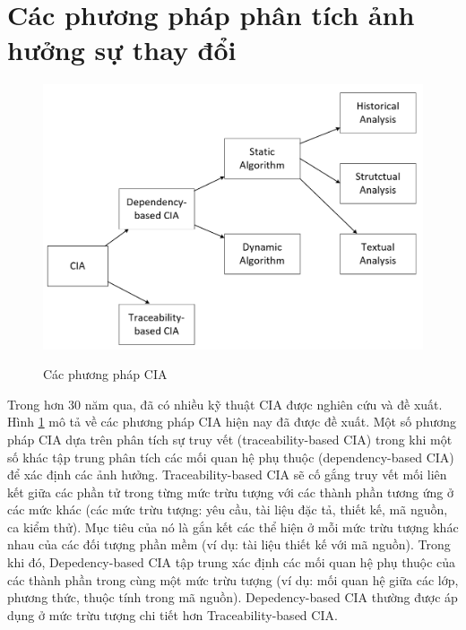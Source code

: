 \documentclass[12pt]{report}
\begin{document}
\section{Các phương pháp phân tích ảnh hưởng sự thay đổi}
\begin{figure}[h]
	\centering
	\includegraphics[scale=0.5]{CIA-hierarchy}
	\label{fig:cia-hierarchy}
	\caption{Các phương pháp CIA}
\end{figure}

Trong hơn 30 năm qua, đã có nhiều kỹ thuật CIA được nghiên cứu và đề xuất. Hình \ref{fig:cia-hierarchy} mô tả về các phương pháp CIA hiện nay đã được đề xuất. Một số phương pháp CIA dựa trên phân tích sự truy vết (traceability-based CIA) trong khi một số khác tập trung phân tích các mối quan hệ phụ thuộc (dependency-based CIA) để xác định các ảnh hưởng. Traceability-based CIA sẽ cố gắng truy vết mối liên kết giữa các phần tử trong từng mức trừu tượng với các thành phần tương ứng ở các mức khác (các mức trừu tượng: yêu cầu, tài liệu đặc tả, thiết kế, mã nguồn, ca kiểm thử). Mục tiêu của nó là gắn kết các thể hiện ở mỗi mức trừu tượng khác nhau của các đối tượng phần mềm (ví dụ: tài liệu thiết kế với mã nguồn). Trong khi đó, Depedency-based CIA tập trung xác định các mối quan hệ phụ thuộc của các thành phần trong cùng một mức trừu tượng (ví dụ: mối quan hệ giữa các lớp, phương thức, thuộc tính trong mã nguồn). Depedency-based CIA thường được áp dụng ở mức trừu tượng chi tiết hơn Traceability-based CIA.
\end{document}
